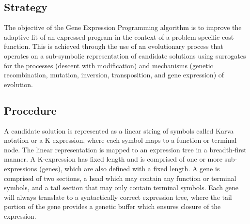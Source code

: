 \subsection{Strategy}
The objective of the Gene Expression Programming algorithm is to improve the adaptive fit of an expressed program in the context of a problem specific cost function.
This is achieved through the use of an evolutionary process that operates on a sub-symbolic representation of candidate solutions using surrogates for the processes (descent with modification) and mechanisms (genetic recombination, mutation, inversion, transposition, and gene expression) of evolution.

\subsection{Procedure}
A candidate solution is represented as a linear string of symbols called Karva notation or a K-expression, where each symbol maps to a function or terminal node. The linear representation is mapped to an expression tree in a breadth-first manner. 
A K-expression has fixed length and is comprised of one or more sub-expressions (genes), which are also defined with a fixed length. A gene is comprised of two sections, a head which may contain any function or terminal symbols, and a tail section that may only contain terminal symbols. Each gene will always translate to a syntactically correct expression tree, where the tail portion of the gene provides a genetic buffer which ensures closure of the expression.

